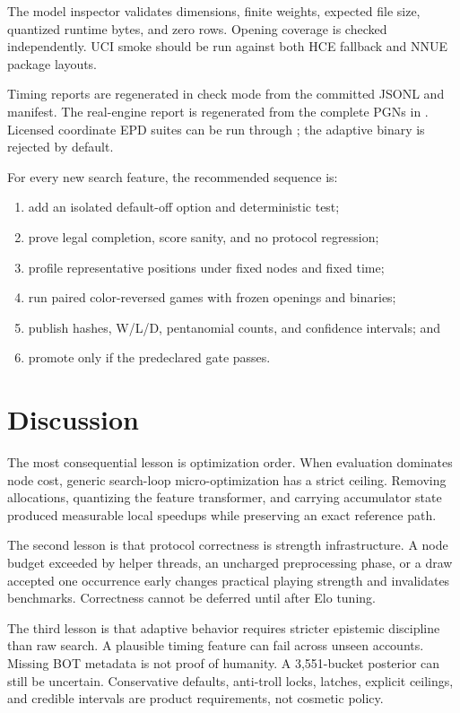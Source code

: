 \documentclass[conference]{IEEEtranSSP}
\newcommand{\code}[1]{\texttt{\detokenize{#1}}}
\begin{document}
The model inspector validates dimensions, finite weights, expected file size, quantized runtime bytes, and zero rows. Opening coverage is checked independently. UCI smoke should be run against both HCE fallback and NNUE package layouts.

Timing reports are regenerated in check mode from the committed JSONL and manifest. The real-engine report is regenerated from the complete PGNs in \code{benchmarks/real-engines}. Licensed coordinate EPD suites can be run through \code{tools/uci_epd_suite.py}; the adaptive binary is rejected by default.

For every new search feature, the recommended sequence is:
\begin{enumerate}
  \item add an isolated default-off option and deterministic test;
  \item prove legal completion, score sanity, and no protocol regression;
  \item profile representative positions under fixed nodes and fixed time;
  \item run paired color-reversed games with frozen openings and binaries;
  \item publish hashes, W/L/D, pentanomial counts, and confidence intervals; and
  \item promote only if the predeclared gate passes.
\end{enumerate}

\section{Discussion}
The most consequential lesson is optimization order. When evaluation dominates node cost, generic search-loop micro-optimization has a strict ceiling. Removing allocations, quantizing the feature transformer, and carrying accumulator state produced measurable local speedups while preserving an exact reference path.

The second lesson is that protocol correctness is strength infrastructure. A node budget exceeded by helper threads, an uncharged preprocessing phase, or a draw accepted one occurrence early changes practical playing strength and invalidates benchmarks. Correctness cannot be deferred until after Elo tuning.

The third lesson is that adaptive behavior requires stricter epistemic discipline than raw search. A plausible timing feature can fail across unseen accounts. Missing BOT metadata is not proof of humanity. A 3,551-bucket posterior can still be uncertain. Conservative defaults, anti-troll locks, latches, explicit ceilings, and credible intervals are product requirements, not cosmetic policy.
\end{document}
